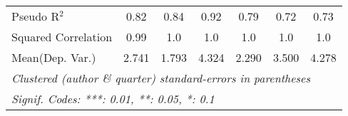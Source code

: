 \begin{tabular}{lcccccc}
   Pseudo R$^2$                                               & 0.82         & 0.84    & 0.92      & 0.79    & 0.72      & 0.73\\  
   Squared Correlation                                        & 0.99         & 1.0     & 1.0       & 1.0     & 1.0       & 1.0\\  
Mean(Dep. Var.) & 2.741 & 1.793 & 4.324 & 2.290 & 3.500 & 4.278 \\
   \midrule \midrule
   \multicolumn{7}{l}{\emph{Clustered (author \& quarter) standard-errors in parentheses}}\\
   \multicolumn{7}{l}{\emph{Signif. Codes: ***: 0.01, **: 0.05, *: 0.1}}\\
\end{tabular}
\par\endgroup
